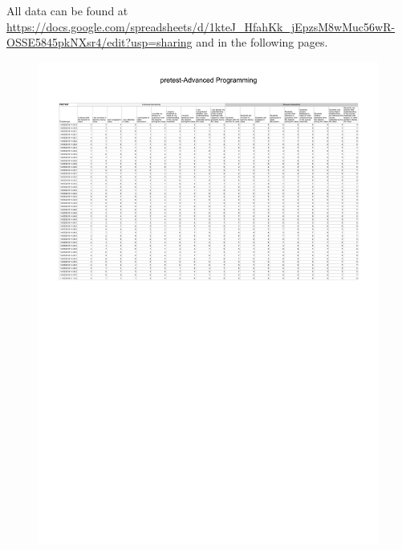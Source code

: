 All data can be found at \url{https://docs.google.com/spreadsheets/d/1kteJ_HfahKk_jEpzsM8wMuc56wR-OSSE5845pkNXsr4/edit?usp=sharing} and in the following pages.


\begin{figure}[H]
  \centering
    \includegraphics[angle=90]{sections/appendicies/data1.pdf}
    \caption*{}
\end{figure}


